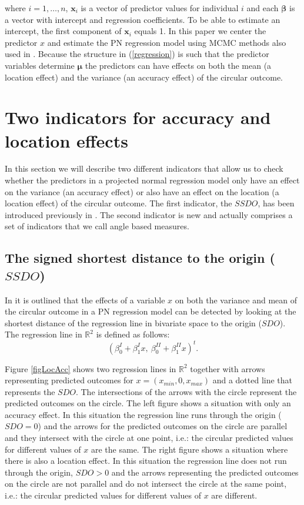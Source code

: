 \documentclass[]{interact}
\begin{document}
where $i = 1, \dots, n$, $\boldsymbol{x}_{i}$ is a vector of predictor values
for individual $i$ and each $\boldsymbol{\beta}$ is a vector with intercept and
regression coefficients. To be able to estimate an intercept, the first
component of $\boldsymbol{x}_{i}$ equals 1. In this paper we center the
predictor $x$ and estimate the PN regression model using MCMC methods also used
in \cite{CremersMulderKlugkist2017}. Because the structure in (\ref{regression}) is
such that the predictor variables determine $\boldsymbol{\mu}$ the predictors
can have effects on both the mean (a location effect) and the variance (an
accuracy effect) of the circular outcome.





\section{Two indicators for accuracy and location effects}\label{indicators}

In this section we will describe two different indicators that allow us to check
whether the predictors in a projected normal regression model only have an
effect on the variance (an accuracy effect) or also have an effect on the
location (a location effect) of the circular outcome. The first indicator, the
$SSDO$, has been introduced previously in \cite{CremersMulderKlugkist2017}. The second
indicator is new and actually comprises a set of indicators that we call angle
based measures.

\subsection{The signed shortest distance to the origin ($SSDO$)}\label{measure1}

In \cite{CremersMulderKlugkist2017} it is outlined that the effects of a variable $x$
on both the variance and mean of the circular outcome in a PN regression model
can be detected by looking at the shortest distance of the regression line in
bivariate space to the origin ($SDO$). The regression line in $\mathbb{R}^2$ is
defined as follows: $$(\beta_0^I + \beta_1^Ix, \:  \beta_0^{II} +
\beta_1^{II}x)^t.$$

Figure \ref{figLocAcc} shows two regression lines in $\mathbb{R}^2$ together
with arrows representing predicted outcomes for $x = (x_{min}, 0, x_{max})$ and
a dotted line that represents the $SDO$. The intersections of the arrows with
the circle represent the predicted outcomes on the circle. The left figure shows
a situation with only an accuracy effect. In this situation the regression line
runs through the origin ($SDO = 0$) and the arrows for the predicted outcomes on
the circle are parallel and they intersect with the circle at one point, i.e.:
the circular predicted values for different values of $x$ are the same. The
right figure shows a situation where there is also a location effect. In this
situation the regression line does not run through the origin, $SDO > 0$ and the
arrows representing the predicted outcomes on the circle are not parallel and do
not intersect the circle at the same point, i.e.: the circular predicted values
for different values of $x$ are different.
\end{document}
